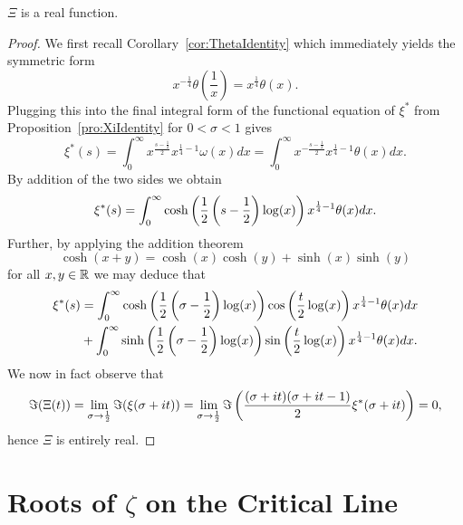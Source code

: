 \begin{lemma}
	$\Xi$ is a real function.
\end{lemma}
\begin{proof}
	We first recall Corollary~\ref{cor:ThetaIdentity} which immediately yields the symmetric form
\begin{equation*}
	x^{-\frac{1}{4}} \theta(\frac{1}{x}) = x^{\frac{1}{4}} \theta(x).
\end{equation*}
	Plugging this into the final integral form of the functional equation of $\xi^*$ from Proposition~\ref{pro:XiIdentity} for $0 < \sigma < 1$ gives
\begin{equation*}
	\xi^*(s) = \int _0 ^\infty x^{\frac{s - \frac{1}{2}}{2}} x^{\frac{1}{4} - 1} \omega(x) dx = \int _0 ^\infty x^{-\frac{s - \frac{1}{2}}{2}} x^{\frac{1}{4} - 1} \theta(x) dx.
\end{equation*}
	By addition of the two sides we obtain
\begin{equation*}
	\xi^*(s) = \int _0 ^\infty \cosh\left(\frac{1}{2} \left(s - \frac{1}{2}\right) \log(x)\right) x^{\frac{1}{4} - 1} \theta(x) dx.
\end{equation*}
	Further, by applying the addition theorem
\begin{equation*}
	\cosh(x + y) = \cosh(x)\cosh(y) + \sinh(x) \sinh(y)
\end{equation*}	
	for all $x,y \in \mathbb{R}$ we may deduce that
\begin{equation*}
\begin{aligned}	
	\xi^*(s) 
		&= \int _0 ^\infty \cosh\left(\frac{1}{2} \left(\sigma - \frac{1}{2}\right) \log(x)\right) \cos\left(\frac{t}{2} \log(x)\right) x^{\frac{1}{4} - 1} \theta(x) dx \\
		&+ \int _0 ^\infty \sinh\left(\frac{1}{2} \left(\sigma - \frac{1}{2}\right) \log(x)\right) \sin\left(\frac{t}{2} \log(x)\right) x^{\frac{1}{4} - 1} \theta(x) dx.
\end{aligned}
\end{equation*}
	We now in fact observe that
\begin{equation*}
	\Im(\Xi(t)) = \lim _{\sigma \to \frac{1}{2}} \Im(\xi(\sigma + it)) = \lim _{\sigma \to \frac{1}{2}} \Im\left(\frac{(\sigma + it)(\sigma + it - 1)}{2}\xi^*(\sigma + it)\right) = 0,
\end{equation*}
	hence $\Xi$ is entirely real.
\end{proof}


\section{Roots of $\zeta$ on the Critical Line}


